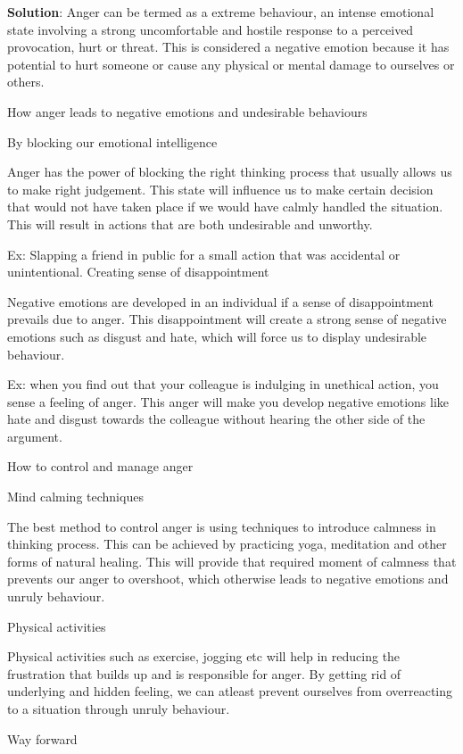 \documentclass[
  openany]{book}
\newenvironment{solution}{ {\bfseries Solution}:}{}
\begin{document}
\begin{questions}
\begin{solution}
Anger can be termed as a extreme behaviour, an intense emotional state involving a strong uncomfortable and hostile response to a perceived provocation, hurt or threat. This is considered a negative emotion because it has potential to hurt someone or cause any physical or mental damage to ourselves or others.

How anger leads to negative emotions and undesirable behaviours

By blocking our emotional intelligence

Anger has the power of blocking the right thinking process that usually allows us to make right judgement. This state will influence us to make certain decision that would not have taken place if we would have calmly handled the situation. This will result in actions that are both undesirable and unworthy.

Ex: Slapping a friend in public for a small action that was accidental or unintentional.
    Creating sense of disappointment

Negative emotions are developed in an individual if a sense of disappointment prevails due to anger. This disappointment will create a strong sense of negative emotions such as disgust and hate, which will force us to display undesirable behaviour.

Ex: when you find out that your colleague is indulging in unethical action, you sense a feeling of anger. This anger will make you develop negative emotions like hate and disgust towards the colleague without hearing the other side of the argument.

How to control and manage anger

Mind calming techniques

The best method to control anger is using techniques to introduce calmness in thinking process. This can be achieved by practicing yoga, meditation and other forms of natural healing. This will provide that required moment of calmness that prevents our anger to overshoot, which otherwise leads to negative emotions and unruly behaviour.

Physical activities

Physical activities such as exercise, jogging etc will help in reducing the frustration that builds up and is responsible for anger. By getting rid of underlying and hidden feeling, we can atleast prevent ourselves from overreacting to a situation through unruly behaviour.

Way forward


\end{solution}
\end{questions}
\end{document}
